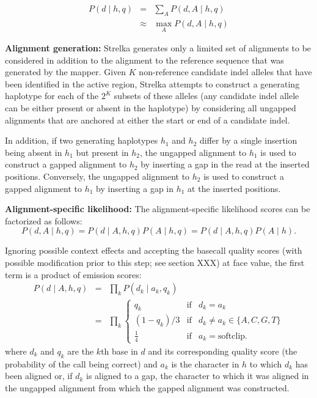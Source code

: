 \documentclass{article}
\begin{document}
\begin{eqnarray*}
\label{eq:read_lik}
P(d \mid h,q) & = & \sum_A P(d,A \mid h,q)\\
& \approx & \max_A P(d,A \mid h,q)
\end{eqnarray*}

{\bf Alignment generation:}
Strelka generates only a limited set of alignments to be considered in addition to the alignment to the reference sequence that was generated by the mapper. Given $K$ non-reference candidate indel alleles that have been identified in the active region, Strelka attempts to construct a generating haplotype for each of the $2^K$ subsets of these alleles (any candidate indel allele can be either present or absent in the haplotype) by considering all ungapped alignments that are anchored at either the start or end of a candidate indel.

In addition, if two generating haplotypes $h_1$ and $h_2$ differ by a single insertion being absent in $h_1$ but present in $h_2$, the ungapped alignment to $h_1$ is used to construct a gapped alignment to $h_2$ by inserting a gap in the read at the inserted positions. Conversely, the ungapped alignment to $h_2$ is used to construct a gapped alignment to $h_1$ by inserting a gap in $h_1$ at the inserted positions.

{\bf Alignment-specific likelihood:}
The alignment-specific likelihood scores can be factorized as follows:
\begin{equation*}
\label{eq:al_lik}
P(d,A \mid h,q) = P(d \mid A,h,q)P(A \mid h,q) = P(d \mid A,h,q)P(A \mid h).
\end{equation*}

Ignoring possible context effects and accepting the basecall quality scores (with possible modification prior to this step; see section XXX) at face value, the first term is a product of emission scores:
\begin{eqnarray*}
P(d \mid A,h,q) & = & \prod_k P(d_k \mid a_k,q_k)\\
& = & \prod_k \left\{
                        \begin{array}{lcl}
                             q_k & \mathrm{if} & d_k=a_k\\
                             (1-q_k)/3 & \mathrm{if} &  d_k \neq a_k \in \{A,C,G,T\}\\
                             \frac{1}{4} & \mathrm{if} & a_k=\mathrm{softclip}.
                        \end{array}
                      \right.
\end{eqnarray*}
where $d_k$ and $q_k$ are the $k$th base in $d$ and its corresponding quality score (the probability of the call being correct) and $a_k$ is the character in $h$ to which $d_k$ has been aligned or, if $d_k$ is aligned to a gap, the character to which it was aligned in the ungapped alignment from which the gapped alignment was constructed.
\end{document}
